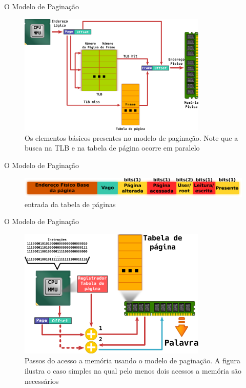 \documentclass[xcolor={usenames,svgnames,dvipsnames},brazil,english,12pt,aspectratio=149]{beamer}
\begin{document}
\begin{frame}{O Modelo de Paginação}
	\begin{figure}[!h]
		\centering
		\includegraphics[width=0.8\textwidth]{paginacao} 
		\caption{Os elementos básicos presentes no modelo de paginação. Note que a busca na TLB e na tabela de página ocorre em paralelo}
		\label{fig:paginacao}
	\end{figure}
\end{frame}

\begin{frame}{O Modelo de Paginação}
	\begin{figure}[!h]
		\centering
		\includegraphics[width=\textwidth]{pte}
		\caption{entrada da tabela de páginas}
		\label{fig:pte}
	\end{figure}
\end{frame}

\begin{frame}{O Modelo de Paginação}
	\begin{figure}[!h]
		\centering
		\includegraphics[width=0.8\textwidth]{paginacao_passos} 
		\caption{Passos do acesso a memória usando o modelo de paginação. A figura ilustra o caso simples na qual pelo menos dois acessos a memória são necessários}
		\label{fig:passos_paginacao}
	\end{figure}
\end{frame}
\end{document}
